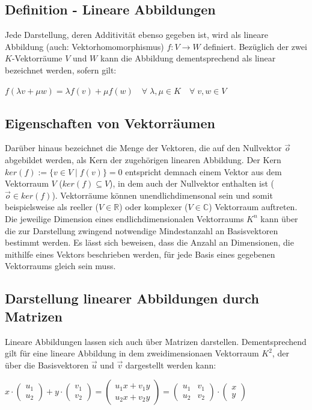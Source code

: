 \documentclass[]{dsadokumentation}
\begin{document}
\subsection{Definition - Lineare Abbildungen}
Jede Darstellung, deren Additivität ebenso gegeben ist, wird als lineare Abbildung (auch: Vektorhomomorphismus) $f: V \rightarrow W$ definiert. Bezüglich der zwei $K$-Vektorräume $V$ und $W$ kann die Abbildung dementsprechend als linear bezeichnet werden, sofern gilt:
\begin{center} $f(\lambda v + \mu w)=\lambda f(v) + \mu f(w) \quad \forall \; \lambda, \mu \in K \quad \forall \; v, w \in V$ \end{center}

\subsection{Eigenschaften von Vektorräumen}
Darüber hinaus bezeichnet die Menge der Vektoren, die auf den Nullvektor $\vec{o}$ abgebildet werden, als Kern der zugehörigen linearen Abbildung. Der Kern $ker(f):= \{v \in V \; \big\vert \; f(v) \} = 0$ entspricht demnach einem Vektor aus dem Vektorraum $V$ ($ker(f) \subseteq V$), in dem auch der Nullvektor enthalten ist ($\vec{o} \in ker(f)$). Vektorräume können unendlichdimensonal sein und somit beispielsweise als reeller ($V \in \mathbb{R}$) oder komplexer ($V \in \mathbb{C}$) Vektorraum auftreten. Die jeweilige Dimension eines endlichdimensionalen Vektorraums $K^n$ kann über die zur Darstellung zwingend notwendige Mindestanzahl an Basisvektoren bestimmt werden. Es lässt sich beweisen, dass die Anzahl an Dimensionen, die mithilfe eines Vektors beschrieben werden, für jede Basis eines gegebenen Vektorraums gleich sein muss. 

\subsection{Darstellung linearer Abbildungen durch Matrizen}
Lineare Abbildungen lassen sich auch über Matrizen darstellen. Dementsprechend gilt für eine lineare Abbildung in dem zweidimensionaen Vektorraum $K^2$, der über die Basisvektoren $\vec{u}$ und $\vec{v}$ dargestellt werden kann:
\begin{center} $x \cdot \left(\begin{array}{c} u_1 \\ u_2 \end{array}\right) + y \cdot \left(\begin{array}{c} v_1 \\ v_2 \end{array}\right) = \left(\begin{array}{c} u_1 x + v_1 y \\ u_2 x + v_2 y \end{array}\right) = \left( \begin{array}{rr} u_1 & v_1 \\ u_2 & v_2 \end{array}\right) \cdot \left(\begin{array}{c} x \\ y \end{array}\right)$ \end{center}
\end{document}
